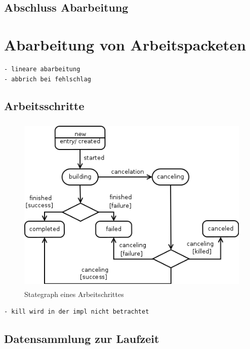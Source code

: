 \subsection{Abschluss Abarbeitung}


\section{Abarbeitung von Arbeitspacketen}

\begin{verbatim}
- lineare abarbeitung
- abbrich bei fehlschlag
\end{verbatim}

\subsection{Arbeitsschritte}


\begin{figure}[ht] 
  \label{fig:lebenszyklus-arbeitsschritt}
  \begin{center}
      \includegraphics[height=3.4in]{imageinput/lebenszyklus-arbeitsschritt.png}
  \end{center}
  \caption{Stategraph eines Arbeitschrittes}
\end{figure}

\begin{verbatim}
- kill wird in der impl nicht betrachtet

\end{verbatim}


\subsection{Datensammlung zur Laufzeit}

